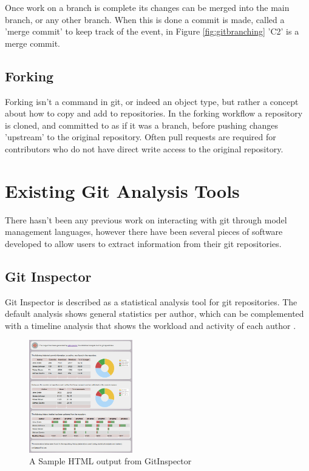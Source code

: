 \documentclass[11pt]{book}
\begin{document}
Once work on a branch is complete its changes can be merged into the main branch, or any other branch. When this is done a commit is made, called a 'merge commit' to keep track of the event, in Figure \ref{fig:gitbranching} 'C2' is a merge commit.

\subsection{Forking}
Forking isn't a command in git, or indeed an object type, but rather a concept about how to copy and add to repositories. In the forking workflow \cite{gitcomparingworkflows} a repository is cloned, and committed to as if it was a branch, before pushing changes 'upstream' to the original repository. Often pull requests are required for contributors who do not have direct write access to the original repository.

\section{Existing Git Analysis Tools}
\label{competitors}
There hasn't been any previous work on interacting with git through model management languages, however there have been several pieces of software developed to allow users to extract information from their git repositories.

\subsection{Git Inspector}
Git Inspector is described as a statistical analysis tool for git repositories. The default analysis shows general statistics per author, which can be complemented with a timeline analysis that shows the workload and activity of each author \cite{gitinspector}.

\begin{figure}[h]
	\centering
	\includegraphics[width=0.4\textwidth]{images/gitinspector}
	\caption{A Sample HTML output from GitInspector \cite{gitinspector}}
	\label{fig:gitinspector}
\end{figure} 
\end{document}
